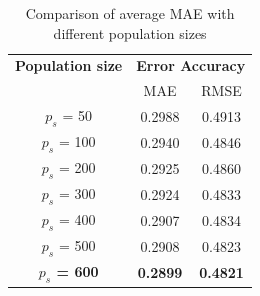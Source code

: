 \documentclass[conference]{IEEEtran}
\begin{document}
\begin{table}[h]
\caption{Comparison of average MAE with different population sizes} 
\begin{center}
\begin{tabular}{| c | c| c |}
\hline
\textbf{Population size} & \multicolumn{2}{c|}{\textbf{Error Accuracy}} \\ \cline{2-3} 
& MAE & RMSE \\ [0.5ex] \hline
$p_s$ = 50	& 0.2988	& 0.4913 \\ \hline
$p_s$ = 100	& 0.2940	& 0.4846 \\ \hline
$p_s$ = 200	& 0.2925	& 0.4860 \\ \hline
$p_s$ = 300	& 0.2924	& 0.4833 \\ \hline
$p_s$ = 400	& 0.2907	& 0.4834 \\ \hline
$p_s$ = 500	& 0.2908	& 0.4823 \\ \hline
\textbf{$p_s$ = 600}	& \textbf{0.2899}	& \textbf{0.4821} \\ \hline
\end{tabular}
\label{table:2_population_size}
\end{center}
\end{table}
\end{document}
